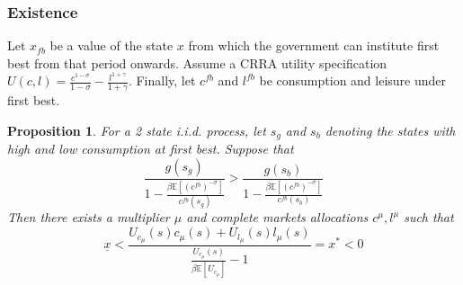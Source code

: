 \documentclass{beamer}
\newcommand{\EE}{\mathbb E}
\newtheorem{proposition}{Proposition}
\begin{document}
 \begin{frame}
	\frametitle{Existence}
	Let $x_{fb}$ be a value of the state $x$ from which the government can institute first best from that period onwards.  Assume a CRRA utility specification $U(c,l) = \frac{c^{1-\sigma}}{1-\sigma} -\frac{ l^{1+\gamma}}{1+\gamma}$.  Finally, let  $c^{fb}$ and $l^{fb}$ be consumption and leisure under first best.
	\begin{proposition}  For a 2 state i.i.d. process, let  $s_g$ and $s_b$ denoting the states with high and low consumption at first best.  Suppose that
	\[
		\frac{g(s_g)}{1-\frac{\beta\EE[(c^{fb})^{-\sigma}]}{c^{fb}(s_g)}} > \frac{g(s_b)}{1-\frac{\beta\EE[(c^{fb})^{-\sigma}]}{c^{fb}(s_b)}}
	\]  Then there exists a multiplier $\mu$ and complete markets allocations $c^\mu,l^\mu$ such that
	\[
	\underline x<\frac{U_{c_\mu}(s)c_\mu(s) + U_{l_\mu}(s) l_\mu(s)}{\frac{U_{c_\mu}(s)}{\beta\EE[U_{c_\mu}]}-1} = x^* <0
	\]
	\end{proposition}
\end{frame}


%
\end{document}
